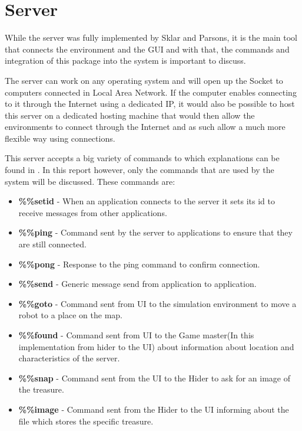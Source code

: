   \section{Server}
    While the server was fully implemented by  Sklar and Parsons\cite{technical}, it is the main tool that connects the environment and the GUI and with that, the commands and integration of this package into the system is important to discuss.

    The server can work on any operating system and will open up the Socket to computers connected in Local Area Network. If the computer enables connecting to it through the Internet using a dedicated IP, it would also be possible to host this server on a dedicated hosting machine that would then allow the environments to connect through the Internet and as such allow a much more flexible way using connections.

    This server accepts a big variety of commands to which explanations can be found in \cite{technical}. In this report however, only the commands that are used by the system will be discussed. These commands are:

      \begin{itemize}
        \item \textbf{\%\%setid} - When an application connects to the server it sets its id to receive messages from other applications.
        \item \textbf{\%\%ping} - Command sent by the server to applications to ensure that they are still connected.
        \item \textbf{\%\%pong} - Response to the ping command to confirm connection.
        \item \textbf{\%\%send} - Generic message send from application to application.
        \item \textbf{\%\%goto} - Command sent from UI to the simulation environment to move a robot to a place on the map.
        \item \textbf{\%\%found} - Command sent from UI to the Game master(In this implementation from hider to the UI) about information about location and characteristics of the server.
        \item \textbf{\%\%snap} - Command sent from the UI to the Hider to ask for an image of the treasure.
        \item \textbf{\%\%image} - Command sent from the Hider to the UI informing about the file which stores the specific treasure.
      \end{itemize}

